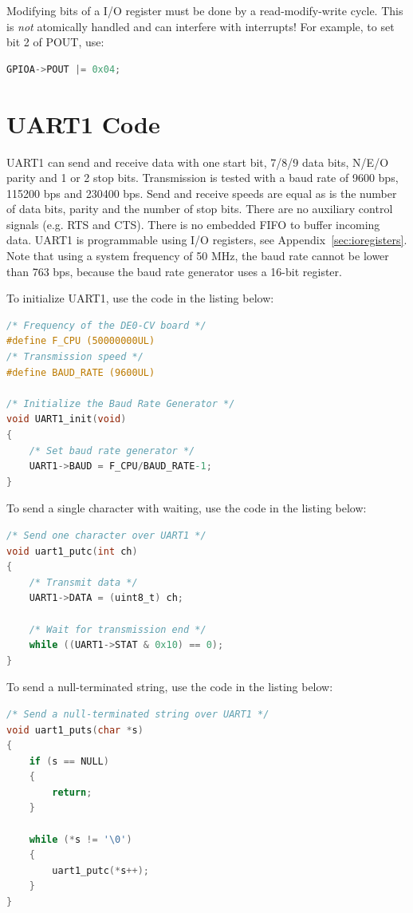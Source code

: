 \documentclass[12pt]{article}
\begin{document}
Modifying bits of a I/O register must be done by a read-modify-write cycle. This is \emph{not} atomically handled and can interfere with interrupts! For example, to set bit 2 of POUT, use:

\begin{lstlisting}[language=C]
GPIOA->POUT |= 0x04;
\end{lstlisting}

\section{UART1 Code}

UART1 can send and receive data with one start bit, 7/8/9 data bits, N/E/O parity and 1 or 2 stop bits. Transmission is tested with a baud rate of 9600 bps, 115200 bps and 230400 bps. Send and receive speeds are equal as is the number of data bits, parity and the number of stop bits. There are no auxiliary control signals (e.g. RTS and CTS). There is no embedded FIFO to buffer incoming data. UART1 is programmable using I/O registers, see Appendix~\ref{sec:ioregisters}. Note that using a system frequency of 50 MHz, the baud rate cannot be lower than 763 bps, because the baud rate generator uses a 16-bit register.

To initialize UART1, use the code in the listing below:

\begin{lstlisting}[language=C]
/* Frequency of the DE0-CV board */
#define F_CPU (50000000UL)
/* Transmission speed */
#define BAUD_RATE (9600UL)

/* Initialize the Baud Rate Generator */
void UART1_init(void)
{
    /* Set baud rate generator */
    UART1->BAUD = F_CPU/BAUD_RATE-1;
}
\end{lstlisting}

To send a single character with waiting, use the code in the listing below:

\begin{lstlisting}[language=C]
/* Send one character over UART1 */
void uart1_putc(int ch)
{
    /* Transmit data */
    UART1->DATA = (uint8_t) ch;
            
    /* Wait for transmission end */
    while ((UART1->STAT & 0x10) == 0);
}
\end{lstlisting}

To send a null-terminated string, use the code in the listing below:

\begin{lstlisting}[language=C]
/* Send a null-terminated string over UART1 */
void uart1_puts(char *s)
{
    if (s == NULL)
    {
        return;
    }

    while (*s != '\0')
    {
        uart1_putc(*s++);
    }
}
\end{lstlisting}
\end{document}
